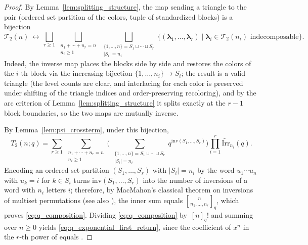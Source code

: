 \documentclass[pdftex]{sigma}
\numberwithin{equation}{section}
\newcommand{\ssp}{\hspace{1pt}}
\theoremstyle{definition}
\begin{document}
\begin{proof}
	By Lemma~\ref{lem:splitting_structure}, the map sending a triangle to the
	pair (ordered set partition of the colors, tuple of standardized
	blocks) is a bijection
	\begin{equation*}
		\mathcal{T}_2(n)\,\longleftrightarrow\,
		\bigsqcup_{r\ge1}\,
		\bigsqcup_{\substack{n_1+\cdots+n_r=n\\ n_i\ge1}}\,
		\bigsqcup_{\substack{\{1,\dots,n\}=S_1\sqcup\cdots\sqcup S_r\\
		|S_i|=n_i}}
		\bigl\{(\boldsymbol\lambda_1,\dots,\boldsymbol\lambda_r)\mid
		\boldsymbol\lambda_i\in\mathcal{T}_2(n_i)
		\text{ indecomposable}\bigr\}.
	\end{equation*}
	Indeed, the inverse map places the blocks side by side and restores
	the colors of the $i$-th block via the increasing bijection
	$\{1,\dots,n_i\}\to S_i$; the result is a valid triangle (the level
	counts are clear, and interlacing for each color is preserved under
	shifting of the triangle indices and order-preserving recoloring),
	and by the arc criterion of Lemma~\ref{lem:splitting_structure} it splits
	exactly at the $r-1$ block boundaries, so the two maps are mutually
	inverse.

	By Lemma~\ref{lem:psi_crossterm}, under this bijection,
	\begin{equation*}
		T_2(n;q)
		=\sum_{r\ge1}\, \sum_{\substack{n_1+\cdots+n_r=n\\ n_i\ge1}}
		\Biggl(\ \sum_{\substack{\{1,\dots,n\}=S_1\sqcup\cdots\sqcup
		S_r\\ |S_i|=n_i}}
		q^{\mathrm{inv}(S_1,\dots,S_r)}\Biggr)
		\prod_{i=1}^{r}\widetilde{\mathrm{Irr}}_{n_i}(q).
	\end{equation*}
	Encoding an ordered set partition $(S_1,\dots,S_r)$ with $|S_i|=n_i$
	by the word $u_1\cdots u_n$ with $u_k=i$ for $k\in S_i$ turns
	$\mathrm{inv}(S_1,\dots,S_r)$ into the number of inversions of a
	word with $n_i$ letters $i$; therefore, by MacMahon's classical
	theorem on inversions of multiset permutations \cite{MacMahonBook}
	(see also \cite[Section~1.3]{Stanley1997}), the inner sum equals
 ${n\brack n_1,\dots,n_r}_q$, which proves \eqref{eq:q_composition}.
	Dividing \eqref{eq:q_composition} by~$[n]_q!$ and summing over
	$n\ge0$ yields \eqref{eq:q_exponential_first_return}, since the
	coefficient of $x^n$ in the $r$-th power of
	\smash{$\sum_{j\ge1}\widetilde{\mathrm{Irr}}_j(q)\ssp x^j/[j]_q!$} equals
	.
\end{proof}
\end{document}
